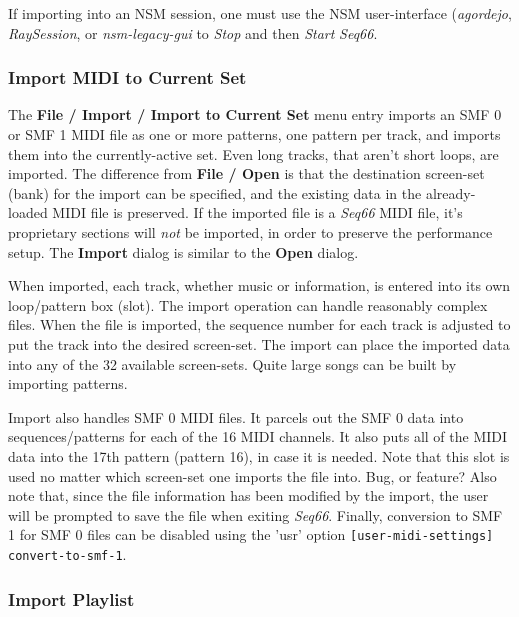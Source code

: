    If importing into an NSM session, one must use the NSM user-interface
   (\textsl{agordejo}, \textsl{RaySession}, or \textsl{nsm-legacy-gui}
   to \textsl{Stop} and then \textsl{Start} \textsl{Seq66}.

\subsubsection{Import MIDI to Current Set}
\label{subsubsec:midi_export_file_import}

   The \textbf{File / Import / Import to Current Set} menu entry imports an SMF 0
   or SMF 1 MIDI file as one or more patterns, one pattern per track, and
   imports them into the currently-active set.
   Even long tracks, that aren't short loops, are imported.
   The difference from \textbf{File / Open} is that the destination screen-set
   (bank) for the import can be specified, and the existing data in the
   already-loaded MIDI file is preserved.
   If the imported file is a
   \textsl{Seq66} MIDI file, it's proprietary sections will
   \textsl{not} be imported, in order to preserve the performance setup.
   The \textbf{Import} dialog is similar to the \textbf{Open} dialog.

   When imported, each track, whether music or information,
   is entered into its own loop/pattern box (slot).
   The import operation can handle reasonably complex files.
   When the file is imported, the sequence number for each track is
   adjusted to put the track into the desired screen-set.
   The import can place the imported data into any of the 32 available
   screen-sets.  Quite large songs can be built by importing patterns.

   Import also handles SMF 0 MIDI files.  It parcels out the SMF 0 data
   into sequences/patterns for each of the 16 MIDI channels.  It also puts
   all of the MIDI data into the 17th pattern (pattern 16), in case it is
   needed.  Note that this slot is used no matter which screen-set one imports
   the file into.  Bug, or feature?
   Also note that, since the file information has been modified by the import,
   the user will be prompted to save the file when exiting \textsl{Seq66}.
   Finally, conversion to SMF 1 for SMF 0 files can be disabled using the
   'usr' option \texttt{[user-midi-settings] convert-to-smf-1}.

\subsubsection{Import Playlist}
\label{subsubsec:midi_export_file_import_playlist}

